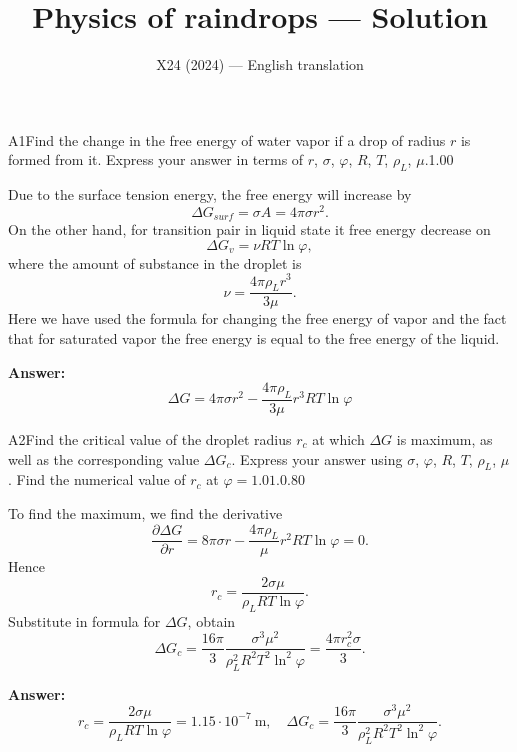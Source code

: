 \documentclass[11pt,a4paper]{article}
\title{\textbf{Physics of raindrops --- Solution}}
\author{\normalsize X24 (2024) — English translation}
\date{}
\begin{document}
\maketitle\vspace{-0.5em}
\begin{solcard}{A1}{Find the change in the free energy of water vapor if a drop of radius $r$ is formed from it. Express your answer in terms of $r$, $\sigma$, $\varphi$, $R$, $T$, $\rho_L$, $\mu$.}{1.00}

Due to the surface tension energy, the free energy will increase by $$ \Delta G_{surf} = \sigma A = 4 \pi \sigma r^2. $$On the other hand, for transition pair in liquid state it free energy decrease on $$ \Delta G _v = \nu R T \ln \varphi, $$where the amount of substance in the droplet is $$ \nu = \frac{4\pi \rho_L r^3}{3 \mu}. $$Here we have used the formula for changing the free energy of vapor and the fact that for saturated vapor the free energy is equal to the free energy of the liquid.

\par\smallskip\noindent\textbf{Answer:} $$ \Delta G = 4 \pi \sigma r^2 - \frac{4\pi \rho_L }{3 \mu}r^3 R T \ln \varphi $$
\end{solcard}

\begin{solcard}{A2}{Find the critical value of the droplet radius $r_c$ at which $\Delta G$ is maximum, as well as the corresponding value $\Delta G_c$. Express your answer using $\sigma$, $\varphi$, $R$, $T$, $\rho_L$, $\mu$. Find the numerical value of $r_c$ at $\varphi = 1.01$.}{0.80}

To find the maximum, we find the derivative $$ \frac{\partial \Delta G}{\partial r}  = 8 \pi \sigma r - \frac{4\pi \rho_L }{ \mu} r^2 RT \ln \varphi = 0. $$Hence $$ r_c = \frac{2 \sigma \mu}{\rho_L R T \ln \varphi}. $$Substitute in formula for $\Delta G$, obtain $$ \Delta G_c = \frac{16 \pi}{3} \frac{\sigma^3 \mu^2}{\rho_L^2 R^2 T^2 \ln^2 \varphi} = \frac{4\pi r_c^2 \sigma}{3}. $$

\par\smallskip\noindent\textbf{Answer:} $$ r_c = \frac{2 \sigma \mu}{\rho_L R T \ln \varphi} = 1.15 \cdot 10^{-7}~\text{m}, \quad \Delta G_c = \frac{16 \pi}{3} \frac{\sigma^3 \mu^2}{\rho_L^2 R^2 T^2 \ln^2 \varphi}. $$
\end{solcard}
\end{document}
